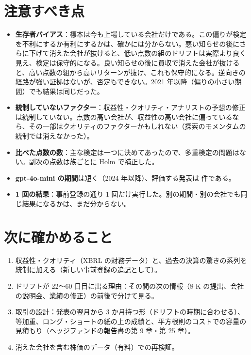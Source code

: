 \section{注意すべき点}

\begin{itemize}
\item \textbf{生存者バイアス}：標本は今も上場している会社だけである。この偏りが検定を不利にするか有利にするかは、確かには分からない。悪い知らせの後にさらに下げて消えた会社が抜けると、低い点数の組のドリフトは実際より良く見え、検定は保守的になる。良い知らせの後に買収で消えた会社が抜けると、高い点数の組から高いリターンが抜け、これも保守的になる。逆向きの経路が強い証拠はないが、否定もできない。2021 年以降（偏りの小さい期間）でも結果は同じだった。
\item \textbf{統制していないファクター}：収益性・クオリティ・アナリストの予想の修正は統制していない。点数の高い会社が、収益性の高い会社に偏っているなら、その一部はクオリティのファクターかもしれない（探索のモメンタムの統制では消えなかった）。
\item \textbf{比べた点数の数}：主な検定は一つに決めてあったので、多重検定の問題はない。副次の点数は族ごとに Holm で補正した。
\item \textbf{gpt-4o-mini の期間}は短く（2024 年以降）、評価する発表は  件である。
\item \textbf{1 回の結果}：事前登録の通り 1 回だけ実行した。別の期間・別の会社でも同じ結果になるかは、まだ分からない。
\end{itemize}

\section{次に確かめること}

\begin{enumerate}
\item 収益性・クオリティ（XBRL の財務データ）と、過去の決算の驚きの系列を統制に加える（新しい事前登録の追記として）。
\item ドリフトが 22〜60 日目に出る理由：その間の次の情報（8-K の提出、会社の説明会、業績の修正）の前後で分けて見る。
\item 取引の設計：発表の翌月から 3 か月持つ形（ドリフトの時期に合わせる）、等加重、ロング・ショートの紙の上の成績と、平方根則のコストでの容量の見積もり（ヘッジファンドの報告書の第 9 章・第 25 章）。
\item 消えた会社を含む株価のデータ（有料）での再検証。
\end{enumerate}
